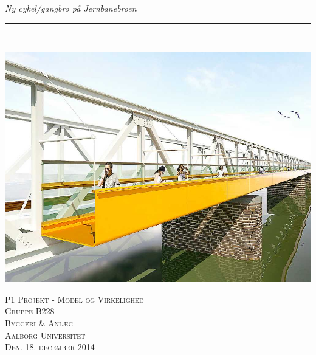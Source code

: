 \thispagestyle{empty}
\begin{flushright}
\vspace{3cm}

\phantom{hul}

\phantom{hul}

\phantom{hul}

\textsl{\Huge Ny cykel/gangbro på Jernbanebroen} \\ \vspace{1cm}

\rule{13cm}{3mm} \\ \vspace{1.5cm}
\vspace{1cm}

\includegraphics[width=1.0\textwidth]{billeder/forside.jpg}

\vspace{2cm} 
\textsc{\Large P1 Projekt - Model og Virkelighed \\
Gruppe B228 \\
Byggeri \& Anlæg\\
Aalborg Universitet\\
Den. 18. december 2014\\}
\end{flushright}
